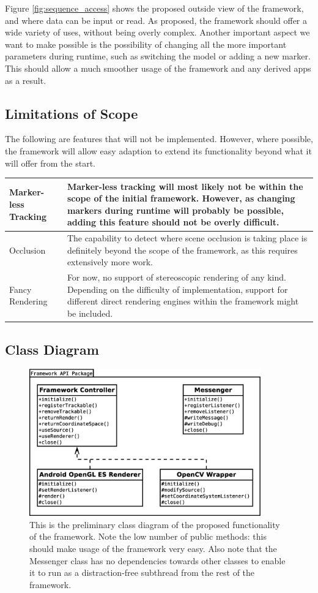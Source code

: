 Figure \ref{fig:sequence_access} shows the proposed outside view of the framework, and where data can be input or read.
As proposed, the framework should offer a wide variety of uses, without being overly complex.
Another important aspect we want to make possible is the possibility of changing all the more important parameters during runtime, such as switching the model or adding a new marker.
This should allow a much smoother usage of the framework and any derived apps as a result.

\subsection{Limitations of Scope}

The following are features that will not be implemented.
However, where possible, the framework will allow easy adaption to extend its functionality beyond what it will offer from the start.

\begin{tabulary}{\textwidth}{L || L}
Marker-less Tracking & Marker-less tracking will most likely not be within the scope of the initial framework. However, as changing markers during runtime will probably be possible, adding this feature should not be overly difficult.\\
\hline
Occlusion & The capability to detect where scene occlusion is taking place is definitely beyond the scope of the framework, as this requires extensively more work.\\
\hline
Fancy Rendering & For now, no support of stereoscopic rendering of any kind. Depending on the difficulty of implementation, support for different direct rendering engines within the framework might be included.\\
\end{tabulary}

\subsection{Class Diagram}

\begin{figure}
	\centering
	\includegraphics[width=10cm]{images/class_diagram.eps}
	\caption[General Class Diagram]{This is the preliminary class diagram of the proposed functionality of the framework. Note the low number of public methods: this should make usage of the framework very easy. Also note that the Messenger class has no dependencies towards other classes to enable it to run as a distraction-free subthread from the rest of the framework.}
	\label{fig:class_diagram}
\end{figure}


